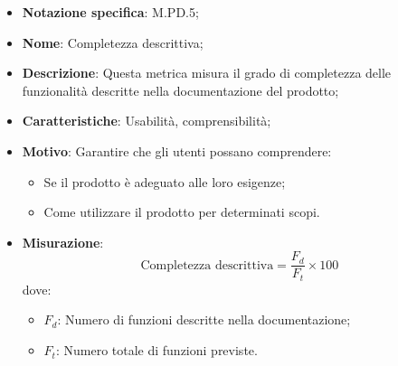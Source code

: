 \begin{itemize}
    \item \textbf{Notazione specifica}: M.PD.5;
    \item \textbf{Nome}: Completezza descrittiva;
    \item \textbf{Descrizione}: Questa metrica misura il grado di completezza delle funzionalità descritte nella documentazione del prodotto;
    \item \textbf{Caratteristiche}: Usabilità, comprensibilità;
    \item \textbf{Motivo}: Garantire che gli utenti possano comprendere:
    \begin{itemize}
        \item Se il prodotto è adeguato alle loro esigenze;
        \item Come utilizzare il prodotto per determinati scopi.
    \end{itemize}
    \item \textbf{Misurazione}:
    \[
    \text{Completezza descrittiva} = \frac{F_{d}}{F_{t}} \times 100
    \]
    dove:
    \begin{itemize}
        \item $F_{d}$: Numero di funzioni descritte nella documentazione;
        \item $F_{t}$: Numero totale di funzioni previste.
    \end{itemize}
\end{itemize}
